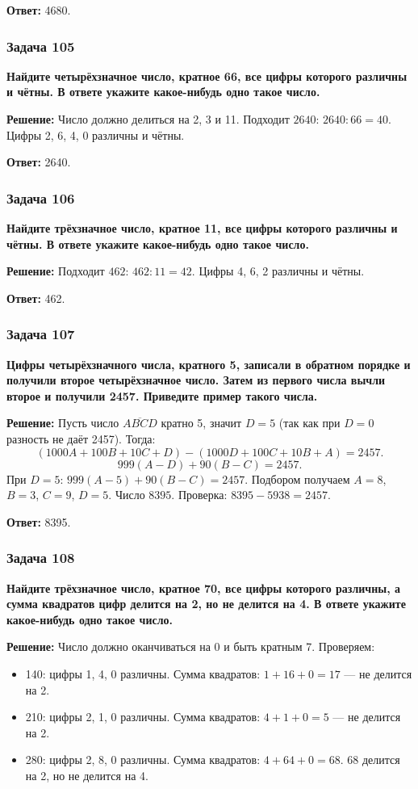 \documentclass[12pt, a4paper]{article}
\begin{document}
\textbf{Ответ:} 4680.

\subsubsection*{Задача 105}
\textbf{Найдите четырёхзначное число, кратное 66, все цифры которого различны и чётны. В ответе укажите какое-нибудь одно такое число.}

\textbf{Решение:}
Число должно делиться на 2, 3 и 11. Подходит $2640$: $2640 : 66 = 40$. Цифры 2, 6, 4, 0 различны и чётны.

\textbf{Ответ:} 2640.

\subsubsection*{Задача 106}
\textbf{Найдите трёхзначное число, кратное 11, все цифры которого различны и чётны. В ответе укажите какое-нибудь одно такое число.}

\textbf{Решение:}
Подходит $462$: $462 : 11 = 42$. Цифры 4, 6, 2 различны и чётны.

\textbf{Ответ:} 462.

\subsubsection*{Задача 107}
\textbf{Цифры четырёхзначного числа, кратного 5, записали в обратном порядке и получили второе четырёхзначное число. Затем из первого числа вычли второе и получили 2457. Приведите пример такого числа.}

\textbf{Решение:}
Пусть число $\overline{ABCD}$ кратно 5, значит $D=5$ (так как при $D=0$ разность не даёт 2457). Тогда:
\[
(1000A+100B+10C+D) - (1000D+100C+10B+A) = 2457.
\]
\[
999(A-D) + 90(B-C) = 2457.
\]
При $D=5$: $999(A-5) + 90(B-C) = 2457$. Подбором получаем $A=8$, $B=3$, $C=9$, $D=5$. Число $8395$. Проверка: $8395 - 5938 = 2457$.

\textbf{Ответ:} 8395.

\subsubsection*{Задача 108}
\textbf{Найдите трёхзначное число, кратное 70, все цифры которого различны, а сумма квадратов цифр делится на 2, но не делится на 4. В ответе укажите какое-нибудь одно такое число.}

\textbf{Решение:}
Число должно оканчиваться на 0 и быть кратным 7. Проверяем:
\begin{itemize}
    \item 140: цифры 1, 4, 0 различны. Сумма квадратов: $1+16+0=17$ — не делится на 2.
    \item 210: цифры 2, 1, 0 различны. Сумма квадратов: $4+1+0=5$ — не делится на 2.
    \item 280: цифры 2, 8, 0 различны. Сумма квадратов: $4+64+0=68$. $68$ делится на 2, но не делится на 4.
\end{itemize}
\end{document}
